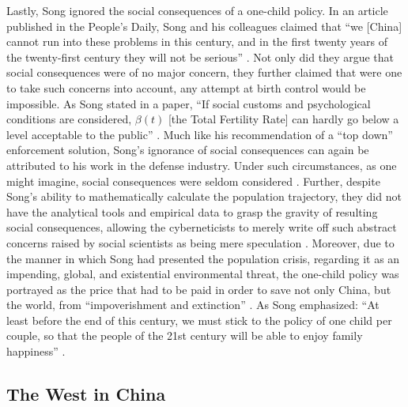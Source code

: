 Lastly, Song ignored the social consequences of a one-child policy. In an article published in the People's Daily, Song and his colleagues claimed that “we [China] cannot run into these problems in this century, and in the first twenty years of the twenty-first century they will not be serious” \autocite[p.\ 248]{Greenhalgh2008JustOneChild}. Not only did they argue that social consequences were of no major concern, they further claimed that were one to take such concerns into account, any attempt at birth control would be impossible. As Song stated in a paper, “If social customs and psychological conditions are considered, $\beta(t)$ [the Total Fertility Rate] can hardly go below a level acceptable to the public” \autocite[p.\ 251]{SongTuanYu1985}. Much like his recommendation of a “top down” enforcement solution, Song’s ignorance of social consequences can again be attributed to his work in the defense industry. Under such circumstances, as one might imagine, social consequences were seldom considered \autocite[p.\ 153]{Greenhalgh2008JustOneChild}. Further, despite Song’s ability to mathematically calculate the population trajectory, they did not have the analytical tools and empirical data to grasp the gravity of resulting social consequences, allowing the cyberneticists to merely write off such abstract concerns raised by social scientists as being mere speculation \autocite[p.\ 286]{Greenhalgh2008JustOneChild}. Moreover, due to the manner in which Song had presented the population crisis, regarding it as an impending, global, and existential environmental threat, the one-child policy was portrayed as the price that had to be paid in order to save not only China, but the world, from “impoverishment and extinction” \autocite[p.\ 287]{Greenhalgh2008JustOneChild}. As Song emphasized: “At least before the end of this century, we must stick to the policy of one child per couple, so that the people of the 21st century will be able to enjoy family happiness” \autocite[p.\ 4]{Song1985SystemsScienceReforms}.

\subsection{The West in China}

